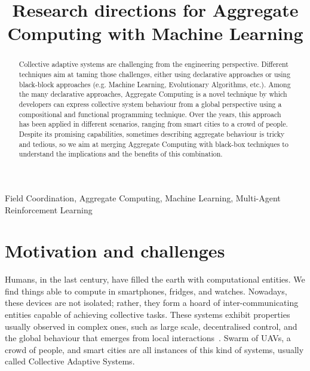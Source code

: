 \documentclass[conference]{IEEEtran}
\begin{document}
\title{Research directions for Aggregate Computing with Machine Learning}

\author{
\and
{}
}

\maketitle
\begin{abstract}
    Collective adaptive systems are challenging from the engineering perspective. Different techniques aim at taming those challenges, either using declarative approaches or using black-block approaches (e.g. Machine Learning, Evolutionary Algorithms, etc.).
    Among the many declarative approaches, Aggregate Computing is a novel technique by which developers can express collective system behaviour from a global perspective using a compositional and functional programming technique.
    Over the years, this approach has been applied in different scenarios, ranging from smart cities to a crowd of people. Despite its promising capabilities, sometimes describing aggregate behaviour is tricky and tedious, so we aim at merging Aggregate Computing with black-box techniques to understand the implications and the benefits of this combination.
\end{abstract}
\begin{IEEEkeywords}
Field Coordination, Aggregate Computing, Machine Learning, Multi-Agent Reinforcement Learning
\end{IEEEkeywords}

\section{Motivation and challenges}
Humans, in the last century, have filled the earth with computational entities. 
%
We find things able to compute in smartphones, fridges, and watches. %
Nowadays, these devices are not isolated; rather, they form a hoard of inter-communicating entities capable of achieving collective tasks. 
These systems exhibit properties usually observed in complex ones, such as large scale, 
decentralised control, and the global behaviour that emerges from local interactions~\cite{DBLP:conf/huc/Ferscha15}. 
Swarm of UAVs, a crowd of people, and smart cities are all instances of this kind of systems, usually called Collective Adaptive Systems.
\end{document}
